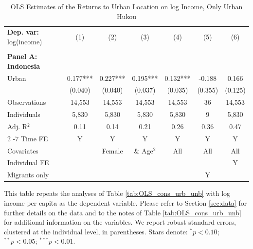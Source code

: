 \begin{table}[htbp] \centering \begin{threeparttable}
 \caption{OLS Estimates of the Returns to Urban Location on log Income, Only Urban Hukou} 
 \label{tab:OLS_CHN_hukou_urban_only_income_urban_unb} 
\begin{tabular}{l cccccc} \toprule  \textbf{Dep. var:}  log(income) 
                    &\multicolumn{1}{c}{(1)}   &\multicolumn{1}{c}{(2)}   &\multicolumn{1}{c}{(3)}   &\multicolumn{1}{c}{(4)}   &\multicolumn{1}{c}{(5)}   &\multicolumn{1}{c}{(6)}   \\
                    &               &               &               &               &               &               \\
\textbf{Panel A: Indonesia} \\
Urban               &       0.177***&       0.227***&       0.195***&       0.132***&      -0.188   &       0.166   \\
                    &     (0.040)   &     (0.040)   &     (0.037)   &     (0.035)   &     (0.355)   &     (0.125)   \\
\addlinespace
Observations        &      14,553   &      14,553   &      14,553   &      14,553   &          36   &      14,553   \\
Individuals         &       5,830   &       5,830   &       5,830   &       5,830   &           9   &       5,830   \\
Adj. R$^{2}$        &        0.11   &        0.14   &        0.21   &        0.26   &        0.36   &        0.47   \\
\cmidrule{2 -7} Time FE & Y & Y & Y & Y & Y & Y \\ Covariates & & Female & \& Age$^2$ & All & All & All \\ Individual FE & & & & & & Y \\ Migrants only & & & & & Y & \\ \bottomrule \end{tabular} \begin{tablenotes}[flushleft] \footnotesize \item{This table repeats the analyses of Table \ref{tab:OLS_cons_urb_unb} with log income per capita as the dependent variable. Please refer to Section \ref{sec:data} for further details on the data and to the notes of Table \ref{tab:OLS_cons_urb_unb} for additional information on the variables. We report robust standard errors, clustered at the individual level, in parentheses. Stars denote: $^{*} p<0.10$; $^{**} p<0.05$; $^{***} p<0.01$.} \end{tablenotes} \end{threeparttable} \end{table}
